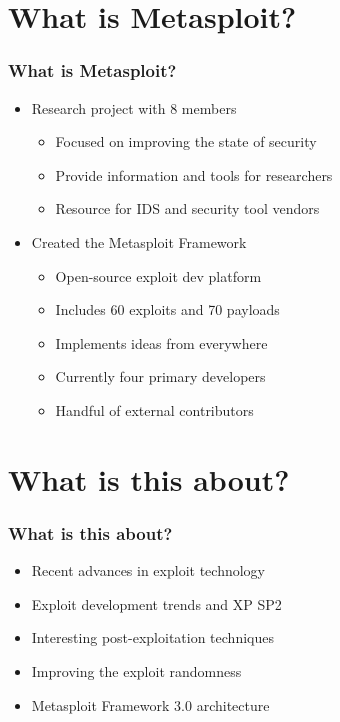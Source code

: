 \documentclass{beamer}
\newenvironment{sitemize}{\vspace{1mm}\begin{itemize}\itemsep 4pt\small}{\end{itemize}}
\begin{document}
\section{What is Metasploit?}
\begin{frame}[t]
  \frametitle{What is Metasploit?}
	\begin{sitemize}
		\item Research project with 8 members 
		\begin{sitemize}
			\item Focused on improving the state of security
			\item Provide information and tools for researchers
			\item Resource for IDS and security tool vendors
		\end{sitemize}
	\end{sitemize}
	
	\begin{sitemize}			
		\item Created the Metasploit Framework
		\begin{sitemize}
			\item Open-source exploit dev platform
			\item Includes 60 exploits and 70 payloads
			\item Implements ideas from everywhere
			\item Currently four primary developers
			\item Handful of external contributors
		\end{sitemize}
	\end{sitemize}
\end{frame}

\section{What is this about?}
\begin{frame}[t]
  \frametitle{What is this about?}
	\begin{sitemize}
		\item Recent advances in exploit technology
		\item Exploit development trends and XP SP2
		\item Interesting post-exploitation techniques	
		\item Improving the exploit randomness
		\item Metasploit Framework 3.0 architecture
	\end{sitemize}  
\end{frame}
\end{document}
